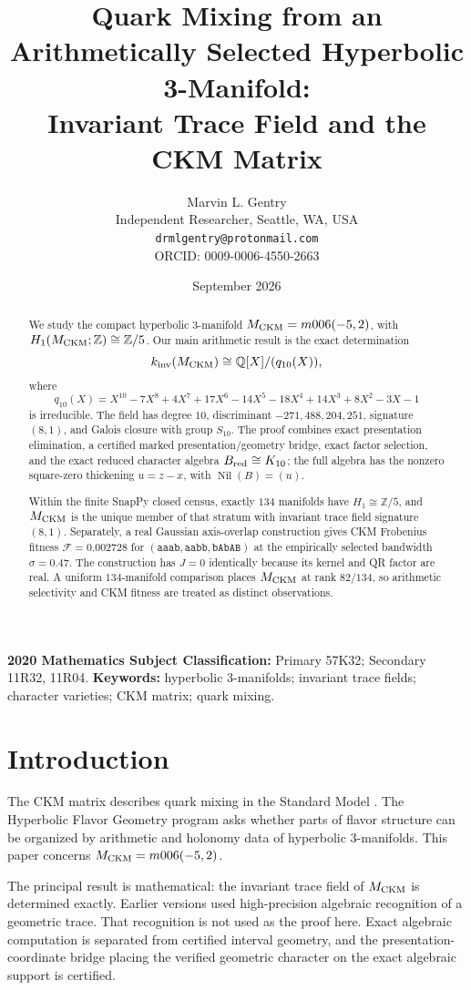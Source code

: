 \documentclass[11pt]{article}
\title{Quark Mixing from an Arithmetically Selected Hyperbolic 3-Manifold:\\Invariant Trace Field and the CKM Matrix}
\author{Marvin L. Gentry\\Independent Researcher, Seattle, WA, USA\\\texttt{drmlgentry@protonmail.com}\\ORCID: 0009-0006-4550-2663}
\date{September 2026}
\newcommand{\Q}{\mathbb Q}\newcommand{\Z}{\mathbb Z}\newcommand{\C}{\mathbb C}
\newcommand{\M}{M_{\rm CKM}}\newcommand{\K}{K_{10}}\newcommand{\kinv}{k_{\rm inv}}
\begin{document}
\maketitle
\begin{abstract}
We study the compact hyperbolic $3$-manifold $\M=m006(-5,2)$, with
$H_1(\M;\Z)\cong\Z/5$. Our main arithmetic result is the exact determination
\[
\kinv(\M)\cong\Q[X]/(q_{10}(X)),
\]
where
\[
q_{10}(X)=X^{10}-7X^8+4X^7+17X^6-14X^5-18X^4+14X^3+8X^2-3X-1
\]
is irreducible. The field has degree $10$, discriminant
$-271{,}488{,}204{,}251$, signature $(8,1)$, and Galois closure with group
$S_{10}$. The proof combines exact presentation elimination, a certified
marked presentation/geometry bridge, exact factor selection, and the exact
reduced character algebra $B_{\rm red}\cong K_{10}$; the full algebra has
the nonzero square-zero thickening $u=z-x$, with
$\operatorname{Nil}(B)=(u)$.

Within the finite SnapPy closed census, exactly $134$ manifolds have
$H_1\cong\Z/5$, and $\M$ is the unique member of that stratum with invariant
trace field signature $(8,1)$. Separately, a real Gaussian axis-overlap
construction gives CKM Frobenius fitness $\mathcal F=0.002728$ for
$(\mathtt{aaab},\mathtt{aabb},\mathtt{bAbAB})$ at the empirically selected
bandwidth $\sigma=0.47$. The construction has $J=0$ identically because its
kernel and QR factor are real. A uniform $134$-manifold comparison places
$\M$ at rank $82/134$, so arithmetic selectivity and CKM fitness are treated
as distinct observations.
\end{abstract}
\noindent\textbf{2020 Mathematics Subject Classification:}
Primary 57K32; Secondary 11R32, 11R04.
\noindent\textbf{Keywords:} hyperbolic 3-manifolds; invariant trace fields; character varieties; CKM matrix; quark mixing.

\section{Introduction}
The CKM matrix describes quark mixing in the Standard Model
\cite{CKM,PDG2024}. The Hyperbolic Flavor Geometry program asks whether
parts of flavor structure can be organized by arithmetic and holonomy data
of hyperbolic $3$-manifolds. This paper concerns $\M=m006(-5,2)$.

The principal result is mathematical: the invariant trace field of $\M$ is
determined exactly. Earlier versions used high-precision algebraic
recognition of a geometric trace. That recognition is not used as the proof
here. Exact algebraic computation is separated from certified interval
geometry, and the presentation-coordinate bridge placing the verified
geometric character on the exact algebraic support is certified.
\end{document}
